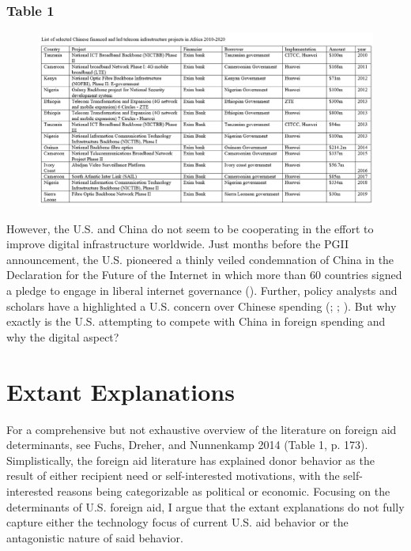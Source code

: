 \documentclass[12pt]{article}
\begin{document}
\subsubsection*{Table 1}
\begin{figure}[htbp]
    \includegraphics[scale=0.449]{Figures/ChineseAid.png}
\end{figure}

However, the U.S. and China do not seem to be cooperating in the effort to improve digital infrastructure worldwide. Just months before the PGII announcement, the U.S. pioneered a thinly veiled condemnation of China in the Declaration for the Future of the Internet in which more than 60 countries signed a pledge to engage in liberal internet governance (\cite{u.s.departmentofstate2022}). Further, policy analysts and scholars have a highlighted a U.S. concern over Chinese spending (\cite{hass2021}; \cite{triolo2020}; \cite{hillman2021}). But why exactly is the U.S. attempting to compete with China in foreign spending and why the digital aspect? %

\section*{Extant Explanations}
For a comprehensive but not exhaustive overview of the literature on foreign aid determinants, see Fuchs, Dreher, and Nunnenkamp 2014 \nocite{fuchs2014} (Table 1, p. 173). Simplistically, the foreign aid literature has explained donor behavior as the result of either recipient need or self-interested motivations, with the self-interested reasons being categorizable as political or economic. Focusing on the determinants of U.S. foreign aid, I argue that the extant explanations do not fully capture either the technology focus of current U.S. aid behavior or the antagonistic nature of said behavior. 
\end{document}
